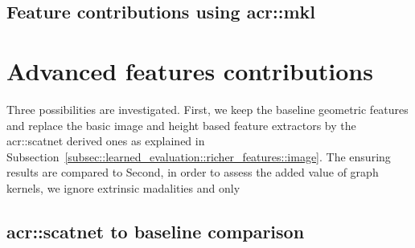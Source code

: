     \subsection{Feature contributions using \acrshort*{acr::mkl}}
        \begin{figure}[htpb]
            \centering
        \end{figure}
    
\section{Advanced features contributions}
    \label{sec::more_experiments::richer_features}
    Three possibilities are investigated.
    First, we keep the baseline geometric features and replace the basic image and height based feature extractors by the \gls{acr::scatnet} derived ones as explained in Subsection~\ref{subsec::learned_evaluation::richer_features::image}.
    The ensuring results are compared to 
    Second, in order to assess the added value of graph kernels, we ignore extrinsic madalities and only 

    \subsection{\texorpdfstring{\acrshort*{acr::scatnet}}{ScatNet} to baseline comparison}
        \label{subsec::more_experiments::richer_features::scatnet_baseline}

